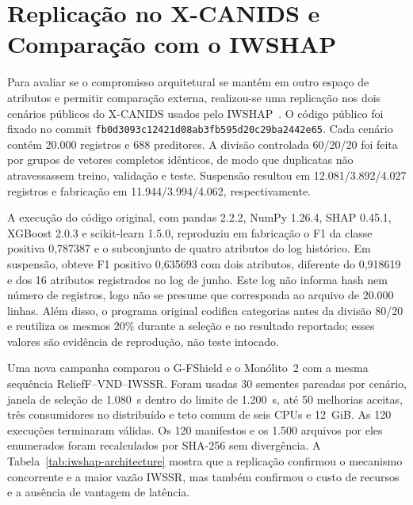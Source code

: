 \section{Replicação no X-CANIDS e Comparação com o IWSHAP}
\label{sec:iwshap-comparison}

Para avaliar se o compromisso arquitetural se mantém em outro espaço de atributos e permitir comparação externa, realizou-se uma replicação nos dois cenários públicos do X-CANIDS usados pelo IWSHAP~\cite{Scherer2024IWSHAP}. O código público foi fixado no commit \texttt{fb0d3093c12421d08ab3fb595d20c29ba2442e65}. Cada cenário contém 20.000 registros e 688 preditores. A divisão controlada 60/20/20 foi feita por grupos de vetores completos idênticos, de modo que duplicatas não atravessassem treino, validação e teste. Suspensão resultou em 12.081/3.892/4.027 registros e fabricação em 11.944/3.994/4.062, respectivamente.

A execução do código original, com pandas 2.2.2, NumPy 1.26.4, SHAP 0.45.1, XGBoost 2.0.3 e scikit-learn 1.5.0, reproduziu em fabricação o F1 da classe positiva 0,787387 e o subconjunto de quatro atributos do log histórico. Em suspensão, obteve F1 positivo 0,635693 com dois atributos, diferente do 0,918619 e dos 16 atributos registrados no log de junho. Este log não informa hash nem número de registros, logo não se presume que corresponda ao arquivo de 20.000 linhas. Além disso, o programa original codifica categorias antes da divisão 80/20 e reutiliza os mesmos 20\% durante a seleção e no resultado reportado; esses valores são evidência de reprodução, não teste intocado.

Uma nova campanha comparou o G-FShield e o Monólito~2 com a mesma sequência ReliefF--VND--IWSSR. Foram usadas 30 sementes pareadas por cenário, janela de seleção de 1.080~s dentro do limite de 1.200~s, até 50 melhorias aceitas, três consumidores no distribuído e teto comum de seis CPUs e 12~GiB. As 120 execuções terminaram válidas. Os 120 manifestos e os 1.500 arquivos por eles enumerados foram recalculados por SHA-256 sem divergência. A Tabela~\ref{tab:iwshap-architecture} mostra que a replicação confirmou o mecanismo concorrente e a maior vazão IWSSR, mas também confirmou o custo de recursos e a ausência de vantagem de latência.

